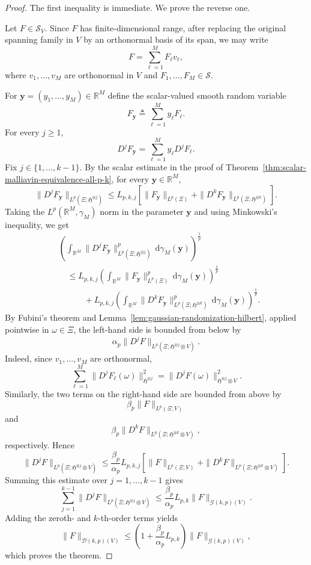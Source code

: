 \documentclass[12pt]{article}
\theoremstyle{plain}
\theoremstyle{definition}
\theoremstyle{remark}
\numberwithin{equation}{section}
\begin{document}
\begin{proof}
	The first inequality is immediate.  We prove the reverse one.
	
	Let $F\in\mathcal{S}_{V}$.  Since $F$ has finite-dimensional range, after replacing the original spanning family in $V$ by an orthonormal basis of its span, we may write
	$$
	F=\sum_{\ell=1}^{M}F_{\ell}v_{\ell},
	$$
	where $v_{1},\ldots,v_{M}$ are orthonormal in $V$ and $F_{1},\ldots,F_{M}\in\mathcal{S}$.
	
	For $\textbf{y}=(y_{1},\ldots,y_{M})\in\mathbb{R}^{M}$ define the scalar-valued smooth random variable
	$$
	F_{\textbf{y}}
	\triangleq
	\sum_{\ell=1}^{M}y_{\ell}F_{\ell}.
	$$
	For every $j\geqslant1$,
	$$
	D^{j}F_{\textbf{y}}
	=
	\sum_{\ell=1}^{M}y_{\ell}D^{j}F_{\ell}.
	$$
	Fix $j\in\{1,\ldots,k-1\}$.  By the scalar estimate in the proof of Theorem~\ref{thm:scalar-malliavin-equivalence-all-p-k}, for every $\textbf{y}\in\mathbb{R}^{M}$,
	$$
	\|D^{j}F_{\textbf{y}}\|_{L^{p}(\Xi;\mathfrak{H}^{\otimes j})}
	\leqslant
	L_{p,k,j}
	\left[
	\|F_{\textbf{y}}\|_{L^{p}(\Xi)}
	+
	\|D^{k}F_{\textbf{y}}\|_{L^{p}(\Xi;\mathfrak{H}^{\otimes k})}
	\right].
	$$
	Taking the $L^{p}(\mathbb{R}^{M},\gamma_{M})$ norm in the parameter $\textbf{y}$ and using Minkowski's inequality, we get
	$$
	\begin{aligned}
		&\left(
		\int_{\mathbb{R}^{M}}
		\|D^{j}F_{\textbf{y}}\|_{L^{p}(\Xi;\mathfrak{H}^{\otimes j})}^{p}
		\,\mathrm{d}\gamma_{M}(\textbf{y})
		\right)^{\frac1p}
		\\
		&\quad\leqslant
		L_{p,k,j}
		\left(
		\int_{\mathbb{R}^{M}}
		\|F_{\textbf{y}}\|_{L^{p}(\Xi)}^{p}
		\,\mathrm{d}\gamma_{M}(\textbf{y})
		\right)^{\frac1p}
		\\
		&\qquad\quad+
		L_{p,k,j}
		\left(
		\int_{\mathbb{R}^{M}}
		\|D^{k}F_{\textbf{y}}\|_{L^{p}(\Xi;\mathfrak{H}^{\otimes k})}^{p}
		\,\mathrm{d}\gamma_{M}(\textbf{y})
		\right)^{\frac1p}.
	\end{aligned}
	$$
	By Fubini's theorem and Lemma~\ref{lem:gaussian-randomization-hilbert}, applied pointwise in $\omega\in\Xi$, the left-hand side is bounded from below by
	$$
	\alpha_{p}
	\|D^{j}F\|_{L^{p}(\Xi;\mathfrak{H}^{\otimes j}\otimes V)}.
	$$
	Indeed, since $v_{1},\ldots,v_{M}$ are orthonormal,
	$$
	\sum_{\ell=1}^{M}
	\|D^{j}F_{\ell}(\omega)\|_{\mathfrak{H}^{\otimes j}}^{2}
	=
	\|D^{j}F(\omega)\|_{\mathfrak{H}^{\otimes j}\otimes V}^{2}.
	$$
	Similarly, the two terms on the right-hand side are bounded from above by
	$$
	\beta_{p}\|F\|_{L^{p}(\Xi;V)}
	$$
	and
	$$
	\beta_{p}
	\|D^{k}F\|_{L^{p}(\Xi;\mathfrak{H}^{\otimes k}\otimes V)},
	$$
	respectively.  Hence
	$$
	\|D^{j}F\|_{L^{p}(\Xi;\mathfrak{H}^{\otimes j}\otimes V)}
	\leqslant
	\frac{\beta_{p}}{\alpha_{p}}L_{p,k,j}
	\left[
	\|F\|_{L^{p}(\Xi;V)}
	+
	\|D^{k}F\|_{L^{p}(\Xi;\mathfrak{H}^{\otimes k}\otimes V)}
	\right].
	$$
	Summing this estimate over $j=1,\ldots,k-1$ gives
	$$
	\sum_{j=1}^{k-1}
	\|D^{j}F\|_{L^{p}(\Xi;\mathfrak{H}^{\otimes j}\otimes V)}
	\leqslant
	\frac{\beta_{p}}{\alpha_{p}}L_{p,k}
	\|F\|_{\mathcal{G}(k,p)(V)}.
	$$
	Adding the zeroth- and $k$-th-order terms yields
	$$
	\|F\|_{\mathcal{D}(k,p)(V)}
	\leqslant
	\left(1+\frac{\beta_{p}}{\alpha_{p}}L_{p,k}\right)
	\|F\|_{\mathcal{G}(k,p)(V)},
	$$
	which proves the theorem.
\end{proof}
\end{document}
